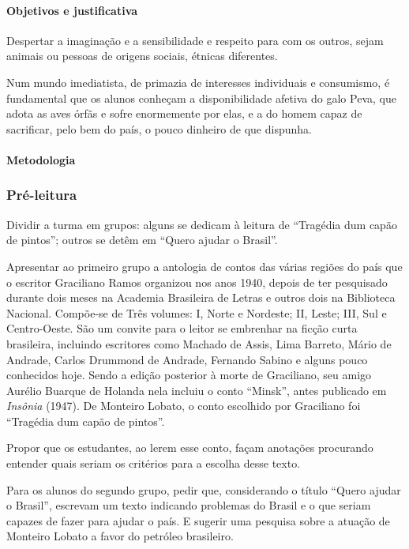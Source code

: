 \documentclass[11pt]{extarticle}
\begin{document}
\paragraph{Objetivos e justificativa}
Despertar a imaginação e a sensibilidade e respeito para com os outros,
sejam animais ou pessoas de origens sociais, étnicas diferentes.

Num mundo imediatista, de primazia de interesses individuais e
consumismo, é fundamental que os alunos conheçam a disponibilidade
afetiva do galo Peva, que adota as aves órfãs e sofre enormemente por
elas, e a do homem capaz de sacrificar, pelo bem do país, o pouco
dinheiro de que dispunha.

\paragraph{Metodologia}

\subsubsection{Pré-leitura}

Dividir a turma em grupos: alguns se dedicam à leitura de ``Tragédia dum
capão de pintos''; outros se detêm em ``Quero ajudar o Brasil''.

Apresentar ao primeiro grupo a antologia de contos das várias regiões do
país que o escritor Graciliano Ramos organizou nos anos 1940, depois de
ter pesquisado durante dois meses na Academia Brasileira de Letras e
outros dois na Biblioteca Nacional. Compõe-se de Três volumes: I, Norte
e Nordeste; II, Leste; III, Sul e Centro-Oeste. São um convite para o
leitor se embrenhar na ficção curta brasileira, incluindo escritores
como Machado de Assis, Lima Barreto, Mário de Andrade, Carlos Drummond
de Andrade, Fernando Sabino e alguns pouco conhecidos hoje. Sendo a
edição posterior à morte de Graciliano, seu amigo Aurélio Buarque de
Holanda nela incluiu o conto ``Minsk'', antes publicado em
\emph{Insônia} (1947). De Monteiro Lobato, o conto escolhido por
Graciliano foi ``Tragédia dum capão de pintos''.

Propor que os estudantes, ao lerem esse conto, façam anotações
procurando entender quais seriam os critérios para a escolha desse
texto.

Para os alunos do segundo grupo, pedir que, considerando o título
``Quero ajudar o Brasil'', escrevam um texto indicando problemas do
Brasil e o que seriam capazes de fazer para ajudar o país. E sugerir uma
pesquisa sobre a atuação de Monteiro Lobato a favor do petróleo
brasileiro.
\end{document}
